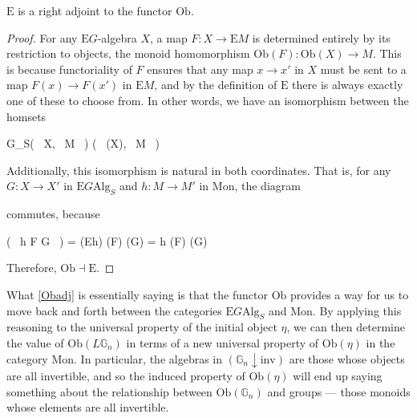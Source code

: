 \begin{prop}\label{Obadj} $\mathrm{E}$ is a right adjoint to the functor $\mathrm{Ob}$. 
\end{prop}
\begin{proof}
For any $\mathrm{E}G$-algebra $X$, a map $F: X \to \mathrm{E}M$ is determined entirely by its restriction to objects, the monoid homomorphism $\mathrm{Ob}(F) : \mathrm{Ob}(X) \to M$. This is because functoriality of $F$ ensures that any map $x \to x'$ in $X$ must be sent to a map $F(x) \to F(x')$ in $\mathrm{E}M$, and by the definition of $\mathrm{E}$ there is always exactly one of these to choose from. In other words, we have an isomorphism between the homsets
\begin{eq*} G_S( \, X, \, M \, ) \quad \cong \quad {}( \, (X), \, M \, ) \end{eq*}
Additionally, this isomorphism is natural in both coordinates. That is, for any $G: X \to X'$ in $\mathrm{E}G\mathrm{Alg}_S$ and $h : M \to M'$ in $\mathrm{Mon}$, the diagram
\begin{eq*}  \end{eq*}
commutes, because
\begin{eq*} ( \, h \circ F \circ G \, ) \quad = \quad {}(Eh) \circ {}(F) \circ {}(G) \quad = \quad h \circ {}(F) \circ {}(G) \end{eq*}
Therefore, $\mathrm{Ob} \dashv \mathrm{E}$.
\end{proof}

What \cref{Obadj} is essentially saying is that the functor $\mathrm{Ob}$ provides a way for us to move back and forth between the categories $\mathrm{E}G\mathrm{Alg}_S$ and $\mathrm{Mon}$. By applying this reasoning to the universal property of the initial object $\eta$, we can then determine the value of $\mathrm{Ob}(L\mathbb{G}_n)$ in terms of a new universal property of $\mathrm{Ob}(\eta)$ in the category $\mathrm{Mon}$. In particular, the algebras in $(\mathbb{G}_n \downarrow \mathrm{inv})$ are those whose objects are all invertible, and so the induced property of $\mathrm{Ob}(\eta)$ will end up saying something about the relationship between $\mathrm{Ob}(\mathbb{G}_n)$ and groups --- those monoids whose elements are all invertible.

